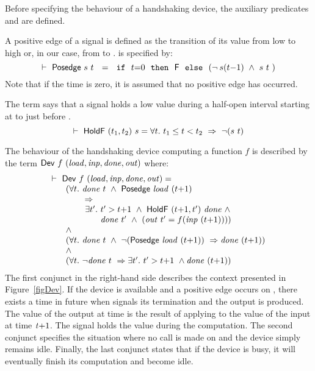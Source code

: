 \documentclass{llncs}
\begin{document}
Before specifying the behaviour of a handshaking device,
the auxiliary predicates  and  are defined.

A positive edge of a signal is defined as the transition of its
value from low to high or, in our case, from  to . 
 is specified by:
\[
\TURNST\ \DEF{Posedge}\ s\ t~ ~=~~ \IF{~t{=}0~}{~\DEF{F}~}{~(\NOT\hspace*{0.8mm} s(t{-}1)\ \AND\ s\ t~})
\]
Note that if the time is zero, it is assumed that no positive edge has
occurred.

The term  says that a
signal  holds a low value  during a half-open interval
starting at  to just before .
\[
\TURNST\ \DEF{HoldF}\ (t_1,t_2)\ s = \forall t.\ t_1 \leq t < t_2\ \IMP\ \NOT(s\ t)
\]

The behaviour of the handshaking device computing a function $f$ is described by the term 
$\DEF{Dev}\ f\ \VAR{(load,inp,done,out)}$ where:
\[
\begin{array}{l}
\TURNST\ \DEF{Dev}\ f\ \VAR{(load,inp,done,out)} = \\
~~\quad     (\forall t.\ \VAR{done}\ t\ \AND\ \DEF{Posedge}\ \VAR{load}\ (t{+}1)\ \\
\phantom{~~\quad     (\forall t.~} \IMP \\
\phantom{~~\quad     (\forall t.\ ~ } \exists t'.\ t' > t{+}1\ \AND\ \DEF{HoldF}\ (t{+}1,t')\ \VAR{done}\ \AND \\
\phantom{~~\quad     (\forall t.\ ~ \exists t'.\ }  \VAR{done}\ t'\ \AND\ (\VAR{out}\ t' = f (\VAR{inp}\ (t{+}1))))\ \\
~~\quad  \AND \\
~~\quad (\forall t.\ \VAR{done}\ t\ \AND\ \NOT(\DEF{Posedge}\ \VAR{load}\ (t{+}1))\ \IMP  \VAR{done}\ (t{+}1))\\
~~\quad  \AND \\
~~\quad (\forall t.\ \NOT\VAR{done}\ t\ \IMP \exists t'.\ t' > t{+}1\ \AND \VAR{done}\ (t{+}1))\\
\end{array}
\]
The first conjunct in the right-hand side describes the context presented
in Figure~\ref{figDev}. If the device is available and a positive
edge occurs on , there exists a time  in future
when  signals its termination and the output is produced.
The value of the output at time  is the result
of applying  to the value of the input at time $\mathit{t}{+}1$.
The signal  holds the value  during the computation.
The second conjunct specifies the situation where no call
is made on  and the device simply remains idle.
Finally, the last conjunct states that if the device
is busy, it will eventually finish its computation
and become idle.
\end{document}
